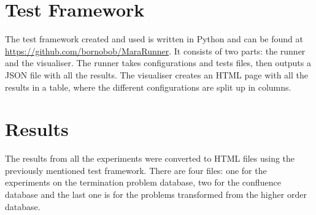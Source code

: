 \chapter{Test Framework}\label{testframework}
The test framework created and used is written in Python and can be found at \url{https://github.com/bornobob/MaraRunner}. It consists of two parts: the runner and the visualiser. The runner takes configurations and tests files, then outputs a JSON file with all the results. The visualiser creates an HTML page with all the results in a table, where the different configurations are split up in columns. 

\chapter{Results}\label{results}
The results from all the experiments were converted to HTML files using the previously mentioned test framework. There are four files: one for the experiments on the termination problem database, two for the confluence database and the last one is for the problems transformed from the higher order database. 